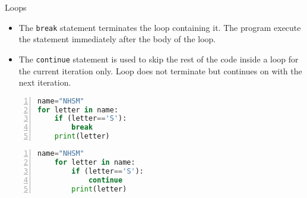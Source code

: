 \begin{frame}[fragile]{Loops}
    \begin{itemize}[<+->]
        \item The \texttt{break} statement terminates the loop containing it. The program execute the statement immediately after the body of the loop.
        \item The \texttt{continue} statement is used to skip the rest of the code inside a loop for the current iteration only. Loop does not terminate but continues on with the next iteration.
    \end{itemize}
\begin{lstlisting}[numbers=left,showstringspaces=false,language=python]
name="NHSM"
for letter in name:
    if (letter=='S'):
        break
    print(letter)
\end{lstlisting}
\begin{lstlisting}[numbers=left,showstringspaces=false,language=python]
    name="NHSM"
    for letter in name:
        if (letter=='S'):
            continue
        print(letter)
    \end{lstlisting}
\end{frame}
